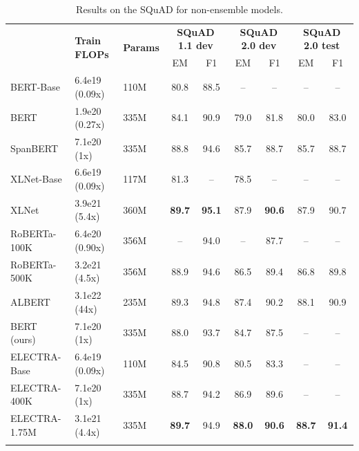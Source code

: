 \documentclass{article}
\newcommand\tstrut{\rule{0pt}{2.6ex}}
\newcommand\bstrut{\rule[-1.0ex]{0pt}{0pt}}
\newcommand{\thinline}{\Xhline{1.5\arrayrulewidth}}
\newcommand{\thickline}{\Xhline{2.5\arrayrulewidth}}
\newcommand{\tsep}	{\bstrut \\ \thinline}
\newcommand{\ttop}{\thickline}
\newcommand{\tbottom}{\bstrut \\ \thickline}
\begin{document}
\addtolength{\tabcolsep}{-4.5pt}
\begin{table}[t!]
\small
\begin{center}
\begin{tabularx}{1.0\linewidth}{X@{\hskip 4mm} l@{\hskip 4mm} l@{\hskip 4mm} c c c c c c}
\ttop
\multirow{2}{*}{\textbf{Model}} & \multirow{2}{*}{\textbf{Train FLOPs}} & \multirow{2}{*}{\textbf{Params}} & \multicolumn{2}{c}{\textbf{SQuAD 1.1 dev\phantom{....}}} & \multicolumn{2}{c}{\textbf{SQuAD 2.0 dev\phantom{....}}} & \multicolumn{2}{c}{\textbf{SQuAD 2.0 test}} \tstrut \\
 & & & EM & F1 & EM & F1 & EM & F1 \tsep
 BERT-Base & 6.4e19 (0.09x) & 110M &  80.8 & 88.5 & -- & -- & -- & -- \tstrut \\
 BERT & 1.9e20 (0.27x) & 335M &  84.1 & 90.9 & 79.0 & 81.8 & 80.0 & 83.0\\
 SpanBERT & 7.1e20 (1x) & 335M & 88.8 & 94.6 & 85.7 & 88.7 & 85.7 & 88.7 \\
 XLNet-Base & 6.6e19 (0.09x) & 117M & 81.3 & -- & 78.5 & -- & -- & -- \\
 XLNet & 3.9e21 (5.4x) & 360M & \textbf{89.7} & \textbf{95.1} & 87.9 & \textbf{90.6} & 87.9 & 90.7 \\
 RoBERTa-100K & 6.4e20 (0.90x) & 356M & -- & 94.0 & -- & 87.7 & -- & -- \\
 RoBERTa-500K & 3.2e21 (4.5x) & 356M & 88.9 & 94.6 & 86.5 & 89.4 & 86.8 & 89.8 \\
 ALBERT & 3.1e22 (44x) & 235M & 89.3 & 94.8 & 87.4 & 90.2& 88.1 & 90.9 \tsep
 BERT (ours) &  7.1e20 (1x) & 335M & 88.0 & 93.7 & 84.7 & 87.5& -- & -- \tstrut \\
 ELECTRA-Base & 6.4e19 (0.09x) & 110M & 84.5 & 90.8 & 80.5 & 83.3 & -- & --\\
 ELECTRA-400K & 7.1e20 (1x) & 335M & 88.7 & 94.2 & 86.9 & 89.6 & -- & --\\
 ELECTRA-1.75M & 3.1e21 (4.4x) & 335M & \textbf{89.7} & 94.9 & \textbf{88.0} & \textbf{90.6} & \textbf{88.7} & \textbf{91.4}
 \tbottom
\end{tabularx} 
\end{center}
\caption{Results on the SQuAD for non-ensemble models.}
\label{tab:squad}
\end{table}
\addtolength{\tabcolsep}{4.5pt}

                            
\end{document}
